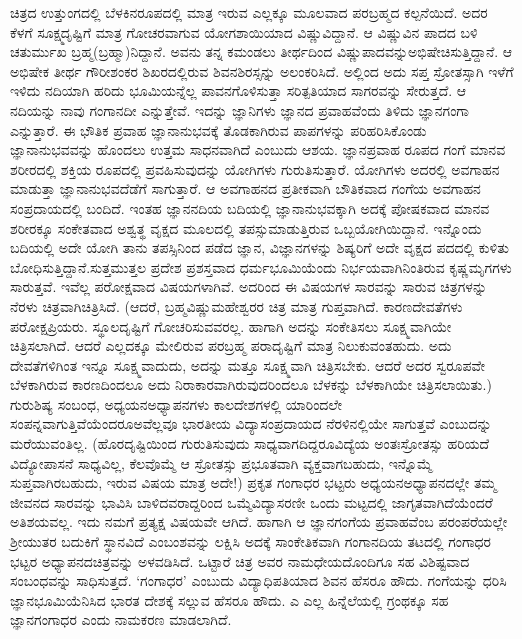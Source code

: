 {ಚಿತ್ರದ ಉತ್ತುಂಗದಲ್ಲಿ ಬೆಳಕಿನರೂಪದಲ್ಲಿ ಮಾತ್ರ ಇರುವ ಎಲ್ಲಕ್ಕೂ ಮೂಲವಾದ ಪರಬ್ರಹ್ಮದ ಕಲ್ಪನೆಯಿದೆ. ಅದರ ಕೆಳಗೆ ಸೂಕ್ಷ್ಮದೃಷ್ಟಿಗೆ ಮಾತ್ರ ಗೋಚರವಾಗುವ ಯೋಗಶಾಯಿಯಾದ ವಿಷ್ಣುವಿದ್ದಾನೆ. ಆ ವಿಷ್ಣುವಿನ ಪಾದದ ಬಳಿ ಚತುರ್ಮುಖ ಬ್ರಹ್ಮ(ಬ್ರಹ್ಮಾ)ನಿದ್ದಾನೆ. ಅವನು ತನ್ನ ಕಮಂಡಲು ತೀರ್ಥದಿಂದ ವಿಷ್ಣುಪಾದವನ್ನು\break ಅಭಿಷೇಚಿಸುತ್ತಿದ್ದಾನೆ. ಆ ಅಭಿಷೇಕ ತೀರ್ಥ ಗೌರೀಶಂಕರ ಶಿಖರದಲ್ಲಿರುವ ಶಿವನ\break ಶಿರಸ್ಸನ್ನು ಅಲಂಕರಿಸಿದೆ. ಅಲ್ಲಿಂದ ಅದು ಸಪ್ತ ಸ್ರೋತಸ್ಸಾಗಿ ಇಳೆಗೆ ಇಳಿದು ನದಿಯಾಗಿ ಹರಿದು ಭೂಮಿಯನ್ನೆಲ್ಲ ಪಾವನಗೊಳಿಸುತ್ತಾ ಸರಿತ್ಪತಿಯಾದ ಸಾಗರವನ್ನು ಸೇರುತ್ತದೆ. ಆ ನದಿಯನ್ನು ನಾವು ಗಂಗಾನದೀ ಎನ್ನುತ್ತೇವೆ. ಇದನ್ನು ಜ್ಞಾನಿಗಳು ಜ್ಞಾನದ ಪ್ರವಾಹವೆಂದು ತಿಳಿದು ಜ್ಞಾನಗಂಗಾ ಎನ್ನುತ್ತಾರೆ. ಈ ಭೌತಿಕ ಪ್ರವಾಹ ಜ್ಞಾನಾನುಭವಕ್ಕೆ ತೊಡಕಾಗಿರುವ ಪಾಪಗಳನ್ನು ಪರಿಹರಿಸಿಕೊಂಡು ಜ್ಞಾನಾನುಭವವನ್ನು ಹೊಂದಲು ಉತ್ತಮ ಸಾಧನವಾಗಿದೆ \enginline{-}ಎಂಬುದು ಆಶಯ.  ಜ್ಞಾನಪ್ರವಾಹ ರೂಪದ ಗಂಗೆ ಮಾನವ ಶರೀರ\-ದಲ್ಲಿ ಶಕ್ತಿಯ ರೂಪದಲ್ಲಿ ಪ್ರವಹಿಸುವುದನ್ನು ಯೋಗಿಗಳು ಗುರುತಿಸುತ್ತಾರೆ. ಯೋಗಿಗಳು ಅದರಲ್ಲಿ ಅವಗಾಹನ ಮಾಡುತ್ತಾ ಜ್ಞಾನಾನುಭವದೆಡೆಗೆ ಸಾಗುತ್ತಾರೆ. ಆ ಅವಗಾಹನದ ಪ್ರತೀಕವಾಗಿ ಬೌತಿಕವಾದ ಗಂಗೆಯ ಅವಗಾಹನ ಸಂಪ್ರದಾಯದಲ್ಲಿ ಬಂದಿದೆ. ಇಂತಹ ಜ್ಞಾನನದಿಯ ಬದಿಯಲ್ಲಿ ಜ್ಞಾನಾನುಭವಕ್ಕಾಗಿ ಅದಕ್ಕೆ ಪೋಷಕವಾದ ಮಾನವ ಶರೀರಕ್ಕೂ ಸಂಕೇತವಾದ ಅಶ್ವತ್ಥ ವೃಕ್ಷದ ಮೂಲದಲ್ಲಿ ತಪಸ್ಸುಮಾಡುತ್ತಿರುವ ಒಬ್ಬ\break ಯೋಗಿಯಿದ್ದಾನೆ. ಇನ್ನೊಂದು ಬದಿಯಲ್ಲಿ ಅದೇ ಯೋಗಿ ತಾನು ತಪಸ್ಸಿನಿಂದ ಪಡೆದ ಜ್ಞಾನ, ವಿಜ್ಞಾನಗಳನ್ನು ಶಿಷ್ಯರಿಗೆ ಅದೇ ವೃಕ್ಷದ ಪದದಲ್ಲಿ ಕುಳಿತು ಬೋಧಿಸುತ್ತಿದ್ದಾನೆ.\break ಸುತ್ತಮುತ್ತಲ ಪ್ರದೇಶ ಪ್ರಶಸ್ತವಾದ ಧರ್ಮಭೂಮಿಯೆಂದು ನಿರ್ಭಯವಾಗಿ\break ನಿಂತಿರುವ ಕೃಷ್ಣಮೃಗಗಳು ಸಾರುತ್ತವೆ.  ಇವೆಲ್ಲ ಪರೋಕ್ಷವಾದ ವಿಷಯಗಳಾಗಿವೆ. ಅದರಿಂದ ಈ ವಿಷಯಗಳ ಸಾರವನ್ನು ಸಾರುವ ಚಿತ್ರಗಳನ್ನು ನೆರಳು ಚಿತ್ರವಾಗಿ\break ಚಿತ್ರಿಸಿದೆ. (ಆದರೆ, ಬ್ರಹ್ಮವಿಷ್ಣುಮಹೇಶ್ವರರ ಚಿತ್ರ ಮಾತ್ರ ಗುಪ್ತವಾಗಿದೆ. ಕಾರಣ\break ದೇವತೆಗಳು ಪರೋಕ್ಷಪ್ರಿಯರು. ಸ್ಥೂಲದೃಷ್ಟಿಗೆ ಗೋಚರಿಸುವವರಲ್ಲ. ಹಾಗಾಗಿ ಅದನ್ನು ಸಂಕೇತಿಸಲು ಸೂಕ್ಷ್ಮವಾಗಿಯೇ ಚಿತ್ರಿಸಲಾಗಿದೆ. ಆದರೆ ಎಲ್ಲದಕ್ಕೂ ಮೇಲಿರುವ ಪರಬ್ರಹ್ಮ ಪರಾದೃಷ್ಟಿಗೆ ಮಾತ್ರ ನಿಲುಕುವಂತಹುದು. ಅದು ದೇವತೆಗಳಿಗಿಂತ ಇನ್ನೂ ಸೂಕ್ಷ್ಮವಾದುದು, ಅದನ್ನು ಮತ್ತೂ ಸೂಕ್ಷ್ಮವಾಗಿ ಚಿತ್ರಿಸಬೇಕು. ಆದರೆ ಅದರ ಸ್ವರೂಪವೇ ಬೆಳಕಾಗಿರುವ ಕಾರಣದಿಂದಲೂ ಅದು ನಿರಾಕಾರವಾಗಿರುವುದರಿಂದಲೂ ಬೆಳಕನ್ನು ಬೆಳಕಾಗಿಯೇ ಚಿತ್ರಿಸಲಾಯಿತು.)  ಗುರು\enginline{-}ಶಿಷ್ಯ ಸಂಬಂಧ, ಅಧ್ಯಯನ\enginline{-}ಅಧ್ಯಾಪನಗಳು ಕಾಲ\enginline{-}ದೇಶಗಳಲ್ಲಿ ಯಾರಿಂದಲೇ ಸಂಪನ್ನವಾಗುತ್ತಿವೆಯೆಂದರೂ\break ಅವೆಲ್ಲವೂ ಭಾರತೀಯ ವಿದ್ಯಾಸಂಪ್ರದಾಯದ ನೆರಳಿನಲ್ಲಿಯೇ ಸಾಗುತ್ತವೆ ಎಂಬುದನ್ನು ಮರೆಯುವಂತಿಲ್ಲ.  (ಹೊರದೃಷ್ಟಿಯಿಂದ ಗುರುತಿಸುವುದು ಸಾಧ್ಯವಾಗದಿದ್ದರೂ\break ವಿದ್ಯೆಯ ಅಂತಃಸ್ರೋತಸ್ಸು ಹರಿಯದೆ ವಿದ್ಯೋಪಾಸನೆ ಸಾಧ್ಯವಿಲ್ಲ, ಕೆಲವೊಮ್ಮೆ ಆ ಸ್ರೋತಸ್ಸು ಪ್ರಭೂತವಾಗಿ ವ್ಯಕ್ತವಾಗಬಹುದು, ಇನ್ನೊಮ್ಮೆ ಸುಪ್ತವಾಗಿರ\-ಬಹುದು, ಇರುವ ವಿಷಯ ಮಾತ್ರ ಅದೇ!) ಪ್ರಕೃತ ಗಂಗಾಧರ ಭಟ್ಟರು ಅಧ್ಯಯನ\enginline{-}ಅಧ್ಯಾಪನ\-ದಲ್ಲೇ ತಮ್ಮ ಜೀವನದ ಸಾರವನ್ನು ಭಾವಿಸಿ ಬಾಳಿದವರಾದ್ದರಿಂದ ಒಮ್ಮೆ\break ವಿದ್ಯಾಸರಣೀ ಒಂದು ಮಟ್ಟದಲ್ಲಿ ಜಾಗೃತವಾಗಿದೆಯೆಂದರೆ ಅತಿಶಯವಲ್ಲ. ಇದು ನಮಗೆ ಪ್ರತ್ಯಕ್ಷ ವಿಷಯವೇ ಆಗಿದೆ. ಹಾಗಾಗಿ ಆ ಜ್ಞಾನಗಂಗೆಯ ಪ್ರವಾಹವೆಂಬ ಪರಂಪರೆಯಲ್ಲೇ ಶ್ರೀಯುತರ ಬದುಕಿಗೆ ಸ್ಥಾನವಿದೆ ಎಂಬಂಶವನ್ನು ಲಕ್ಷಿಸಿ ಅದಕ್ಕೆ ಸಾಂಕೇತಿಕವಾಗಿ ಗಂಗಾನದಿಯ ತಟದಲ್ಲಿ ಗಂಗಾಧರ ಭಟ್ಟರ ಅಧ್ಯಾಪನದ\break ಚಿತ್ರವನ್ನು ಅಳವಡಿಸಿದೆ. ಒಟ್ಟಾರೆ ಚಿತ್ರ ಅವರ ನಾಮಧೇಯದೊಂದಿಗೂ ಸಹ ವಿಶಿಷ್ಟವಾದ ಸಂಬಂಧವನ್ನು ಸಾಧಿಸುತ್ತದೆ. ‘ಗಂಗಾಧರ’ ಎಂಬುದು ವಿದ್ಯಾಧಿಪತಿಯಾದ ಶಿವನ ಹೆಸರೂ ಹೌದು. ಗಂಗೆಯನ್ನು ಧರಿಸಿ ಜ್ಞಾನಭೂಮಿಯೆನಿಸಿದ ಭಾರತ ದೇಶಕ್ಕೆ ಸಲ್ಲುವ ಹೆಸರೂ ಹೌದು. ಎ ಎಲ್ಲ ಹಿನ್ನೆಲೆಯಲ್ಲಿ ಗ್ರಂಥಕ್ಕೂ ಸಹ ಜ್ಞಾನಗಂಗಾಧರ ಎಂದು ನಾಮಕರಣ ಮಾಡಲಾಗಿದೆ. 

}
